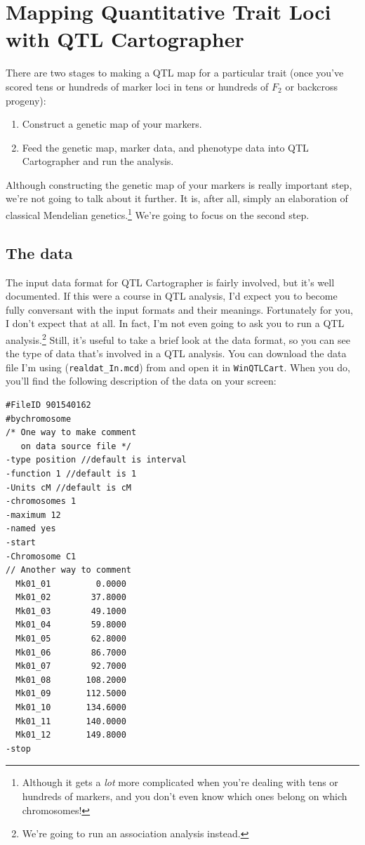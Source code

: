 \chapter{Mapping Quantitative Trait Loci with QTL Cartographer}

There are two stages to making a QTL map for a particular trait
(once you've scored tens or hundreds of marker loci in tens or
hundreds of $F_2$ or backcross progeny):

\begin{enumerate}

\item Construct a genetic map of your markers.

\item Feed the genetic map, marker data, and phenotype data into QTL
Cartographer and run the analysis.

\end{enumerate}

\noindent Although constructing the genetic map of your markers is
really important step, we're not going to talk about it further. It
is, after all, simply an elaboration of classical Mendelian
genetics.\footnote{Although it gets a {\it lot\/} more complicated
  when you're dealing with tens or hundreds of markers, and you don't
  even know which ones belong on which chromosomes!} We're going to
focus on the second step.

\section*{The data}

The input data format for QTL Cartographer is fairly involved, but
it's well documented. If this were a course in QTL analysis, I'd
expect you to become fully conversant with the input formats and their
meanings. Fortunately for you, I don't expect that at all. In fact,
I'm not even going to ask you to run a QTL analysis.\footnote{We're
  going to run an association analysis instead.} Still, it's useful to
take a brief look at the data format, so you can see the type of data
that's involved in a QTL analysis. You can download the data file I'm
using ({\tt realdat\_In.mcd}) from
and open it in {\tt WinQTLCart}. When you do, you'll find the
following description of the data on your screen:

{\small
\begin{verbatim}
#FileID 901540162
#bychromosome
/* One way to make comment
   on data source file */
-type position //default is interval
-function 1 //default is 1
-Units cM //default is cM
-chromosomes 1
-maximum 12 
-named yes
-start
-Chromosome C1
// Another way to comment
  Mk01_01         0.0000
  Mk01_02        37.8000
  Mk01_03        49.1000
  Mk01_04        59.8000
  Mk01_05        62.8000
  Mk01_06        86.7000
  Mk01_07        92.7000
  Mk01_08       108.2000
  Mk01_09       112.5000
  Mk01_10       134.6000
  Mk01_11       140.0000
  Mk01_12       149.8000
-stop

\end{verbatim}
}

